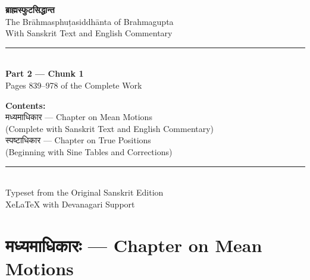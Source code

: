 \documentclass[11pt,a4paper]{book}
\newcommand{\dev}[1]{{\devanagarifont #1}}
\begin{document}
\frontmatter
\begin{titlepage}
\begin{center}
\vspace*{2cm}

{\Huge\bfseries\color{titlecolor} \dev{ब्राह्मस्फुटसिद्धान्त}}\\[1.5cm]
{\LARGE\color{sectioncolor} The Brāhmasphuṭasiddhānta of Brahmagupta}\\[0.5cm]
{\large With Sanskrit Text and English Commentary}\\[2cm]

\rule{0.6\textwidth}{1pt}\\[1cm]

{\Large\bfseries Part 2 --- Chunk 1}\\[0.5cm]
{\large Pages 839--978 of the Complete Work}\\[1cm]

\vspace{1cm}

{\large\color{sectioncolor}
\textbf{Contents:}\\[0.3cm]
\dev{मध्यमाधिकार} --- Chapter on Mean Motions\\
(Complete with Sanskrit Text and English Commentary)\\[0.3cm]
\dev{स्पष्टाधिकार} --- Chapter on True Positions\\
(Beginning with Sine Tables and Corrections)\\[0.5cm]
}

\vfill

\rule{0.4\textwidth}{0.5pt}\\[0.5cm]
{\large Typeset from the Original Sanskrit Edition}\\[0.3cm]
{\small XeLaTeX with Devanagari Support}

\end{center}
\end{titlepage}

\tableofcontents
\clearpage

\mainmatter

\chapter{\dev{मध्यमाधिकारः} --- Chapter on Mean Motions}
\label{chap:madhyama}

\end{document}
